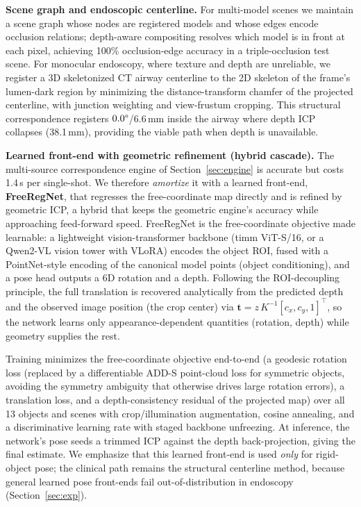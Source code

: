 \documentclass[9pt,twoside,web]{ieeecolor2}
\begin{document}
\textbf{Scene graph and endoscopic centerline.} For multi-model scenes we maintain a scene graph whose nodes are registered models and whose edges encode occlusion relations; depth-aware compositing resolves which model is in front at each pixel, achieving 100\% occlusion-edge accuracy in a triple-occlusion test scene. For monocular endoscopy, where texture and depth are unreliable, we register a 3D skeletonized CT airway centerline to the 2D skeleton of the frame's lumen-dark region by minimizing the distance-transform chamfer of the projected centerline, with junction weighting and view-frustum cropping. This structural correspondence registers $0.0\degree$/6.6\,mm inside the airway where depth ICP collapses (38.1\,mm), providing the viable path when depth is unavailable.

\textbf{Learned front-end with geometric refinement (hybrid cascade).} The multi-source correspondence engine of Section~\ref{sec:engine} is accurate but costs 1.4\,s per single-shot. We therefore \emph{amortize} it with a learned front-end, \textbf{FreeRegNet}, that regresses the free-coordinate map directly and is refined by geometric ICP, a hybrid that keeps the geometric engine's accuracy while approaching feed-forward speed. FreeRegNet is the free-coordinate objective made learnable: a lightweight vision-transformer backbone (timm ViT-S/16, or a Qwen2-VL vision tower with VLoRA) encodes the object ROI, fused with a PointNet-style encoding of the canonical model points (object conditioning), and a pose head outputs a 6D rotation and a depth. Following the ROI-decoupling principle, the full translation is recovered analytically from the predicted depth and the observed image position (the crop center) via $\mathbf{t}=z\,K^{-1}[c_{x},c_{y},1]^{\top}$, so the network learns only appearance-dependent quantities (rotation, depth) while geometry supplies the rest.

Training minimizes the free-coordinate objective end-to-end (a geodesic rotation loss (replaced by a differentiable ADD-S point-cloud loss for symmetric objects, avoiding the symmetry ambiguity that otherwise drives large rotation errors), a translation loss, and a depth-consistency residual of the projected map) over all 13 objects and scenes with crop/illumination augmentation, cosine annealing, and a discriminative learning rate with staged backbone unfreezing. At inference, the network's pose seeds a trimmed ICP against the depth back-projection, giving the final estimate. We emphasize that this learned front-end is used \emph{only} for rigid-object pose; the clinical path remains the structural centerline method, because general learned pose front-ends fail out-of-distribution in endoscopy (Section~\ref{sec:exp}).
\end{document}
